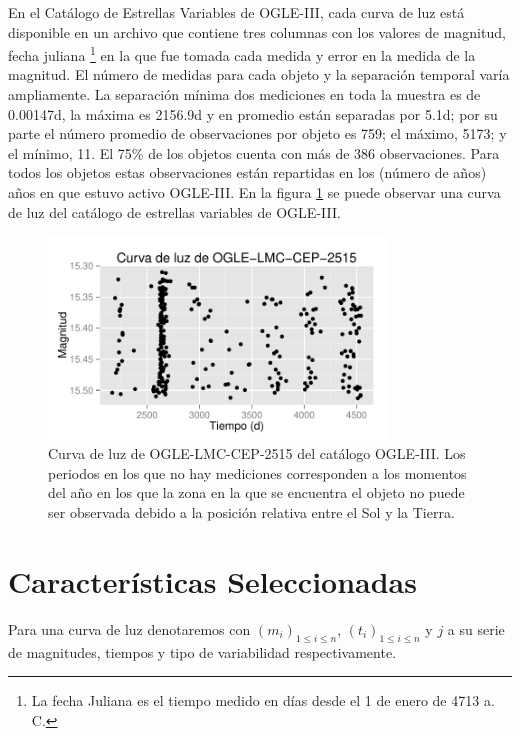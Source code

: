 \documentclass[letterpaper,12pt]{book}
\begin{document}
En el Catálogo de Estrellas Variables de OGLE-III, cada curva de luz está disponible en un archivo que contiene tres columnas con los valores de magnitud, fecha juliana \footnote{La fecha Juliana es el tiempo medido en días desde el 1 de enero de 4713 a. C.} en la que fue tomada cada medida y error en la medida de la magnitud. El número de medidas para cada objeto y la separación temporal varía ampliamente. La separación mínima dos mediciones en toda la muestra es de 0.00147d, la máxima es 2156.9d y en promedio están separadas por 5.1d; por su parte el número promedio de observaciones por objeto es 759; el máximo, 5173; y el mínimo,  11. El 75\% de los objetos cuenta con más de 386 observaciones. Para todos los objetos estas observaciones están repartidas en los (número de años) años en que estuvo activo OGLE-III. En la figura \ref{fig:curvaDeLuz} se puede observar una curva de luz del catálogo de estrellas variables de OGLE-III.    


\begin{figure}
  \centering
  \includegraphics[width = 0.8\textwidth]{./img/C2Datos/curvaDeLuz.pdf}
  \caption{ Curva de luz de OGLE-LMC-CEP-2515 del catálogo OGLE-III. Los periodos en los que no hay mediciones corresponden a los momentos del año en los que la zona en la que se encuentra el objeto no puede ser observada debido a la posición relativa entre el Sol y la Tierra.}
  \label{fig:curvaDeLuz}
\end{figure}



\section{Características Seleccionadas \label{sec:atributos}}

Para una curva de luz denotaremos con $(m_{i})_{1\leq i\leq n}$, $(t_{i})_{1\leq i\leq n}$ y $j$ a su serie de magnitudes, tiempos y tipo de variabilidad respectivamente.
\end{document}
